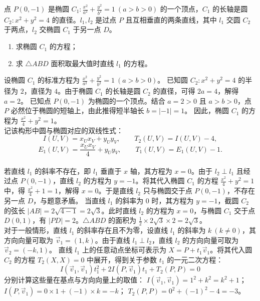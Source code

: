 \begin{example}
点 \(P(0,-1)\) 是椭圆 \(C_1: \frac{x^2}{a^2} + \frac{y^2}{b^2} = 1\ (a > b > 0)\) 的一个顶点，\(C_1\) 的长轴是圆 \(C_2: x^2 + y^2 = 4\) 的直径。\(l_1,l_2\) 是过点 \(P\) 且互相垂直的两条直线，其中 \(l_1\) 交圆 \(C_2\) 于两点，\(l_2\) 交椭圆 \(C_1\) 于另一点 \(D\)。
\begin{enumerate}
    \item[(1)] 求椭圆 \(C_1\) 的方程；
    \item[(2)] 求 \(\triangle ABD\) 面积取最大值时直线 \(l_1\) 的方程。
\end{enumerate}
\end{example}
\begin{solution}
设椭圆 $C_1$ 的标准方程为 $\frac{x^2}{a^2} + \frac{y^2}{b^2} = 1\ (a > b > 0)$。
已知圆 $C_2: x^2 + y^2 = 4$ 的半径为 $2$，直径为 $4$。由于椭圆 $C_1$ 的长轴是圆 $C_2$ 的直径，可得 $2a = 4$，解得 $a = 2$。
已知点 $P(0, -1)$ 为椭圆的一个顶点。结合 $a = 2 > 0$ 且 $a > b > 0$，点 $P$ 必然位于椭圆的短轴上，由此推得短半轴长 $b = |-1| = 1$。
因此，椭圆 $C_1$ 的方程为 $\frac{x^2}{4} + y^2 = 1$。\\
记该构形中圆与椭圆对应的双线性式：
\[
I(U, V) = x_U x_V + y_U y_V,\qquad T_2(U, V) = I(U, V) - 4,
\]
\[
E_1(U, V) = \frac{x_U x_V}{4} + y_U y_V,\qquad T_1(U, V) = E_1(U, V) - 1.
\]
\\
若直线 $l_1$ 的斜率不存在，即 $l_1$ 垂直于 $x$ 轴，其方程为 $x = 0$。由于 $l_2 \perp l_1$ 且经过点 $P(0, -1)$，直线 $l_2$ 的方程为 $y = -1$。将其代入椭圆 $C_1$ 的方程 $\frac{x^2}{4} + y^2 = 1$ 中，得 $\frac{x^2}{4} + 1 = 1$，解得 $x = 0$。于是直线 $l_2$ 只与椭圆交于点 $P(0, -1)$，不存在另一点 $D$，与题意矛盾。
当直线 $l_1$ 的斜率为 $0$ 时，其方程为 $y = -1$，截圆 $C_2$ 的弦长 $|AB| = 2\sqrt{4 - 1} = 2\sqrt{3}$。此时直线 $l_2$ 的方程为 $x = 0$，与椭圆 $C_1$ 交于点 $D(0, 1)$，有 $|PD| = 2$。$\triangle ABD$ 的面积为 $\frac{1}{2} \times 2\sqrt{3} \times 2 = 2\sqrt{3}$。\\
对于一般情形，直线 $l_1$ 的斜率存在且不为零，设直线 $l_1$ 的斜率为 $k\ (k \neq 0)$，其方向向量可取为 $\vec{v}_1 = (1, k)$。由于直线 $l_1 \perp l_2$，直线 $l_2$ 的方向向量可取为 $\vec{v}_2 = (-k, 1)$。
直线 $l_1$ 上的任意动点坐标可表示为 $X = P + t_1\vec{v}_1$。将其代入圆 $C_2$ 的方程 $T_2(X, X) = 0$ 中展开，得到关于参数 $t_1$ 的一元二次方程：
$$ I(\vec{v}_1, \vec{v}_1)t_1^2 + 2I(P, \vec{v}_1)t_1 + T_2(P, P) = 0 $$
分别计算这些量在基点与方向向量上的取值：
$I(\vec{v}_1, \vec{v}_1) = 1^2 + k^2 = k^2 + 1$；
$I(P, \vec{v}_1) = 0 \times 1 + (-1) \times k = -k$；
$T_2(P, P) = 0^2 + (-1)^2 - 4 = -3$。

\end{solution}
